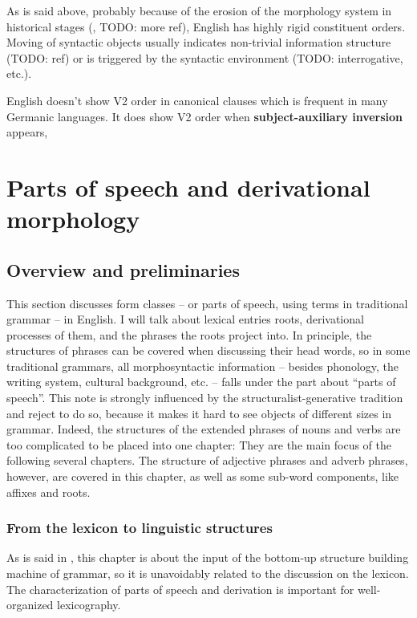 \documentclass[UTF8, a4paper, oneside, scheme=plain]{ctexrep}
\newcommand*{\concept}[1]{\textbf{#1}}
\begin{document}
As is said above, probably because of the erosion of the morphology system in historical stages
(, TODO: more ref),
English has highly rigid constituent orders. 
Moving of syntactic objects usually indicates 
non-trivial information structure (TODO: ref) 
or is triggered by the syntactic environment (TODO: interrogative, etc.).

English doesn't show V2 order in canonical clauses which is frequent in many Germanic languages.
It does show V2 order when \concept{subject-auxiliary inversion} appears,

\chapter{Parts of speech and derivational morphology}\label{chap:pos}

\section{Overview and preliminaries}\label{sec:nouns.overview}

This section discusses form classes -- or parts of speech, using terms in traditional grammar -- in English.
I will talk about lexical entries roots, derivational processes of them,  
and the phrases the roots project into.
In principle, the structures of phrases can be covered when discussing their head words,
so in some traditional grammars,
all morphosyntactic information -- besides phonology, the writing system, cultural background, etc. -- 
falls under the part about ``parts of speech''.
This note is strongly influenced by the structuralist-generative tradition
and reject to do so, 
because it makes it hard to see objects of different sizes in grammar.
Indeed, the structures of the extended phrases of nouns and verbs are too complicated 
to be placed into one chapter:
They are the main focus of the following several chapters.
The structure of adjective phrases and adverb phrases, however, are covered in this chapter,
as well as some sub-word components, like affixes and roots.

\subsection{From the lexicon to linguistic structures}

As is said in ,
this chapter is about the input of the bottom-up structure building machine of grammar,
so it is unavoidably related to the discussion on the lexicon.
The characterization of parts of speech and derivation is important for well-organized lexicography.
\end{document}
